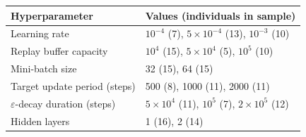 \begin{tabular}{ll}
\toprule
Hyperparameter & Values (individuals in sample) \\
\midrule
Learning rate & $10^{-4}$ (7), $5{\times}10^{-4}$ (13), $10^{-3}$ (10) \\
Replay buffer capacity & $10^4$ (15), $5{\times}10^4$ (5), $10^5$ (10) \\
Mini-batch size & 32 (15), 64 (15) \\
Target update period (steps) & 500 (8), 1000 (11), 2000 (11) \\
$\varepsilon$-decay duration (steps) & $5{\times}10^4$ (11), $10^5$ (7), $2{\times}10^5$ (12) \\
Hidden layers & 1 (16), 2 (14) \\
\bottomrule
\end{tabular}
